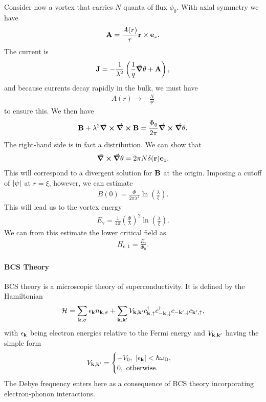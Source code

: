 Consider now a vortex that carries $N$ quanta of flux $\phi_{0}$. With axial symmetry we have
\begin{align*}
	\vb{A} = \frac{A(r)}{r}\vb{r}\times\vb{e}_{z}.
\end{align*}
The current is
\begin{align*}
	\vb{J} = -\frac{1}{\lambda^{2}}\left(\frac{1}{q}\grad{\theta} + \vb{A}\right),
\end{align*}
and because currents decay rapidly in the bulk, we must have
\begin{align*}
	A(r) \to -\frac{N}{qr}
\end{align*}
to ensure this. We then have
\begin{align*}
	\vb{B} + \lambda^{2}\curl{\curl{\vb{B}}} = \frac{\Phi_{0}}{2\pi}\curl{\grad{\theta}}.
\end{align*}
The right-hand side is in fact a distribution. We can show that
\begin{align*}
	\curl{\grad{\theta}} = 2\pi N\delta(\vb{r})\vb{e}_{z}.
\end{align*}
This will correspond to a divergent solution for $\vb{B}$ at the origin. Imposing a cutoff of $\abs{\psi}$ at $r = \xi$, however, we can estimate
\begin{align*}
	B(0) = \frac{\Phi}{2\pi\lambda^{2}}\ln(\frac{\lambda}{\xi}).
\end{align*}
This will lead us to the vortex energy
\begin{align*}
	E_{\text{v}} = \frac{1}{4\pi}\left(\frac{\Phi}{\lambda}\right)^{2}\ln(\frac{\lambda}{\xi}).
\end{align*}
We can from this estimate the lower critical field as
\begin{align*}
H_{\text{c}, 1} = \frac{E_{\text{v}}}{\Phi_{0}}.
\end{align*}

\paragraph{BCS Theory}
BCS theory is a microscopic theory of superconductivity. It is defined by the Hamiltonian
\begin{align*}
	\mathcal{H} = \sum\limits_{\vb{k}, \sigma}\epsilon_{\vb{k}}n_{\vb{k}, \sigma} + \sum\limits_{\vb{k}, \vb{k}^{\prime}}V_{\vb{k}, \vb{k}^{\prime}}c_{\vb{k}, \uparrow}^{\dagger} c_{-\vb{k}, \downarrow}^{\dagger} c_{-\vb{k}^{\prime}, \downarrow}c_{\vb{k}^{\prime}, \uparrow},
\end{align*}
with $\epsilon_{\vb{k}}$ being electron energies relative to the Fermi energy and $V_{\vb{k}, \vb{k}^{\prime}}$ having the simple form
\begin{align*}
	V_{\vb{k}, \vb{k}^{\prime}} = \begin{cases}
		-V_{0},\ \abs{\epsilon_{\vb{k}}} < \hbar\omega_{\text{D}}, \\
		0,\ \text{otherwise.}
	\end{cases}
\end{align*}
The Debye frequency enters here as a consequence of BCS theory incorporating electron-phonon interactions.

